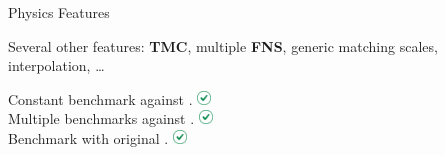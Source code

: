 \documentclass[9pt]{beamer}
\begin{document}
\begin{frame}{\yadism{} Physics Features}
    \vspace*{15pt}
    \begin{center}
        Several other features: \textbf{TMC}, multiple \textbf{FNS}, generic
        matching scales, interpolation, \dots
    \end{center}

    \vspace*{15pt}
    Constant benchmark against \apfel. \includegraphics[width=1em]{green-tick}\\
    Multiple benchmarks against \qcdnum. \includegraphics[width=1em]{green-tick}\\
    Benchmark with original \fonll. \includegraphics[width=1em]{green-tick}
\end{frame}
\end{document}
